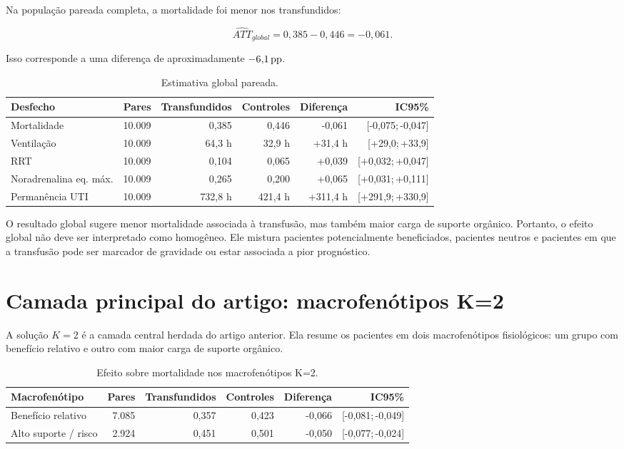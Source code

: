 Na população pareada completa, a mortalidade foi menor nos transfundidos:

\[
\widehat{ATT}_{global}
= 0{,}385 - 0{,}446
= -0{,}061.
\]

Isso corresponde a uma diferença de aproximadamente $-6{,}1\,\text{pp}$.

\begin{table}[ht]
\centering
\caption{Estimativa global pareada.}
\begin{tabular}{lrrrrr}
\toprule
Desfecho & Pares & Transfundidos & Controles & Diferença & IC95\% \\
\midrule
Mortalidade & 10.009 & 0,385 & 0,446 & -0,061 & [-0,075;\,-0,047] \\
Ventilação & 10.009 & 64,3 h & 32,9 h & +31,4 h & [+29,0;\,+33,9] \\
RRT & 10.009 & 0,104 & 0,065 & +0,039 & [+0,032;\,+0,047] \\
Noradrenalina eq. máx. & 10.009 & 0,265 & 0,200 & +0,065 & [+0,031;\,+0,111] \\
Permanência UTI & 10.009 & 732,8 h & 421,4 h & +311,4 h & [+291,9;\,+330,9] \\
\bottomrule
\end{tabular}
\end{table}

O resultado global sugere menor mortalidade associada à transfusão, mas também maior carga de suporte orgânico. Portanto, o efeito global não deve ser interpretado como homogêneo. Ele mistura pacientes potencialmente beneficiados, pacientes neutros e pacientes em que a transfusão pode ser marcador de gravidade ou estar associada a pior prognóstico.

\section{Camada principal do artigo: macrofenótipos K=2}

A solução $K=2$ é a camada central herdada do artigo anterior. Ela resume os pacientes em dois macrofenótipos fisiológicos: um grupo com benefício relativo e outro com maior carga de suporte orgânico.

\begin{table}[ht]
\centering
\caption{Efeito sobre mortalidade nos macrofenótipos K=2.}
\begin{tabular}{lrrrrr}
\toprule
Macrofenótipo & Pares & Transfundidos & Controles & Diferença & IC95\% \\
\midrule
Benefício relativo & 7.085 & 0,357 & 0,423 & -0,066 & [-0,081;\,-0,049] \\
Alto suporte / risco & 2.924 & 0,451 & 0,501 & -0,050 & [-0,077;\,-0,024] \\
\bottomrule
\end{tabular}
\end{table}

